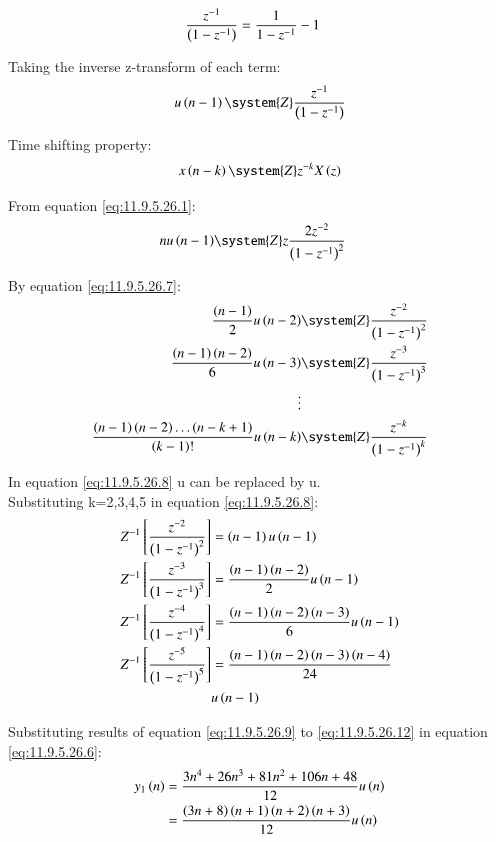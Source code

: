 \documentclass[journal,12pt,twocolumn]{IEEEtran}
\theoremstyle{remark}
\begin{document}
\begin{enumerate}[label=\arabic*.]
\begin{align}
    \frac{z^{-1}}{\left(1-z^{-1}\right)} &= \frac{1}{1-z^{-1}} -1
\end{align}

Taking the inverse z-transform of each term: 
\begin{align}
   u\brak{n-1}\system{Z} \frac{z^{-1}}{\brak{1-z^{-1}}}
\end{align}

Time shifting property:
\begin{align}
     x\brak{n-k}\system{Z} z^{-k}X\brak{z}\label{eq:11.9.5.26.7}
\end{align}

From equation \eqref{eq:11.9.5.26.1}:
\begin{align}
     nu\brak{n-1}&\system{Z} z\frac{2z^{-2}}{\brak{1-z^{-1}}^2}
\end{align}

By equation \eqref{eq:11.9.5.26.7}:
\begin{align}
     \frac{\brak{n-1}}{2}u\brak{n-2}&\system{Z} \frac{z^{-2}}{\brak{1-z^{-1}}^2} \\
     \frac{\brak{n-1}\brak{n-2}}{6}u\brak{n-3}&\system{Z} \frac{z^{-3}}{\brak{1-z^{-1}}^3}\\
     \vdots \notag \\
      \frac{\brak{n-1}\brak{n-2}\ldots \brak{n-k+1}}{\brak{k-1}!}u\brak{n-k}&\system{Z} \frac{z^{-k}}{\brak{1-z^{-1}}^k}\label{eq:11.9.5.26.8}
\end{align}

In equation \eqref{eq:11.9.5.26.8} u can be replaced by u.\\
Substituting k=2,3,4,5 in equation \eqref{eq:11.9.5.26.8}:
\begin{align}
     Z^{-1}\left[\frac{z^{-2}}{\left(1-z^{-1}\right)^2}\right]&=\left(n-1\right)u\left(n-1\right)\label{eq:11.9.5.26.9} \\
     Z^{-1}\left[\frac{z^{-3}}{\left(1-z^{-1}\right)^3}\right]&=\frac{\left(n-1\right)\left(n-2\right)}{2}u\left(n-1\right)\label{eq:11.9.5.26.10} \\
     Z^{-1}\left[\frac{z^{-4}}{\left(1-z^{-1}\right)^4}\right]&=\frac{\left(n-1\right)\left(n-2\right)\left(n-3\right)}{6}u\left(n-1\right)\label{eq:11.9.5.26.11} \\
     Z^{-1}\left[\frac{z^{-5}}{\left(1-z^{-1}\right)^5}\right]&=\frac{\left(n-1\right)\left(n-2\right)\left(n-3\right)\left(n-4\right)}{24}\label{eq:11.9.5.26.12}\\ &u\left(n-1\right) \notag 
\end{align}

Substituting results of equation \eqref{eq:11.9.5.26.9} to \eqref{eq:11.9.5.26.12} in equation \eqref{eq:11.9.5.26.6}:
\begin{align}
    y_1\left(n\right) &= \frac{3n^4 + 26n^3 + 81n^2 + 106n + 48}{12}u\left(n\right)\\
    &= \frac{\left(3n+8\right)\left(n+1\right)\left(n+2\right)\left(n+3\right)}{12}u\left(n\right)
\end{align}


\end{enumerate}
\end{document}

